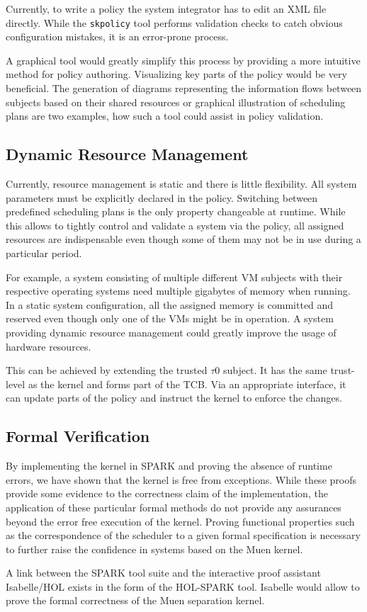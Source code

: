 Currently, to write a policy the system integrator has to edit an XML file
directly. While the \texttt{skpolicy} tool performs validation checks to catch
obvious configuration mistakes, it is an error-prone process.

A graphical tool would greatly simplify this process by providing a more
intuitive method for policy authoring. Visualizing key parts of the policy
would be very beneficial. The generation of diagrams representing the
information flows between subjects based on their shared resources or graphical
illustration of scheduling plans are two examples, how such a tool could assist
in policy validation.

\subsection{Dynamic Resource Management}
Currently, resource management is static and there is little flexibility. All
system parameters must be explicitly declared in the policy. Switching between
predefined scheduling plans is the only property changeable at runtime. While
this allows to tightly control and validate a system via the policy, all
assigned resources are indispensable even though some of them may not be in use
during a particular period.

For example, a system consisting of multiple different VM subjects with their
respective operating systems need multiple gigabytes of memory when running.
In a static system configuration, all the assigned memory is committed and
reserved even though only one of the VMs might be in operation. A system
providing dynamic resource management could greatly improve the usage of
hardware resources.

This can be achieved by extending the trusted $\tau$0 subject. It has the same
trust-level as the kernel and forms part of the TCB. Via an appropriate
interface, it can update parts of the policy and instruct the kernel to enforce
the changes.

\subsection{Formal Verification}
By implementing the kernel in SPARK and proving the absence of runtime errors,
we have shown that the kernel is free from exceptions. While these proofs
provide some evidence to the correctness claim of the implementation, the
application of these particular formal methods do not provide any assurances
beyond the error free execution of the kernel. Proving functional properties
such as the correspondence of the scheduler to a given formal specification is
necessary to further raise the confidence in systems based on the Muen kernel.

A link between the SPARK tool suite and the interactive proof assistant
Isabelle/HOL exists in the form of the HOL-SPARK tool. Isabelle would allow to
prove the formal correctness of the Muen separation kernel.
